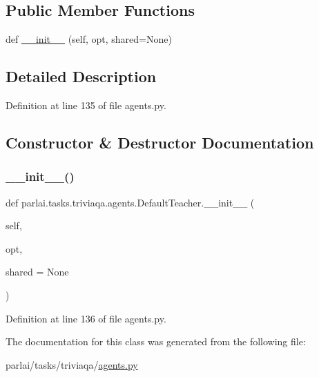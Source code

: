 \subsection*{Public Member Functions}
\begin{DoxyCompactItemize}
\item 
def \hyperlink{classparlai_1_1tasks_1_1triviaqa_1_1agents_1_1DefaultTeacher_aab891504cebc2c749a658d8102d8fbce}{\+\_\+\+\_\+init\+\_\+\+\_\+} (self, opt, shared=None)
\end{DoxyCompactItemize}


\subsection{Detailed Description}


Definition at line 135 of file agents.\+py.



\subsection{Constructor \& Destructor Documentation}
\mbox{\label{classparlai_1_1tasks_1_1triviaqa_1_1agents_1_1DefaultTeacher_aab891504cebc2c749a658d8102d8fbce}} 
\subsubsection{\texorpdfstring{\+\_\+\+\_\+init\+\_\+\+\_\+()}{\_\_init\_\_()}}
{\footnotesize\ttfamily def parlai.\+tasks.\+triviaqa.\+agents.\+Default\+Teacher.\+\_\+\+\_\+init\+\_\+\+\_\+ (\begin{DoxyParamCaption}\item[{}]{self,  }\item[{}]{opt,  }\item[{}]{shared = {\ttfamily None} }\end{DoxyParamCaption})}



Definition at line 136 of file agents.\+py.



The documentation for this class was generated from the following file\+:\begin{DoxyCompactItemize}
\item 
parlai/tasks/triviaqa/\hyperlink{parlai_2tasks_2triviaqa_2agents_8py}{agents.\+py}\end{DoxyCompactItemize}

